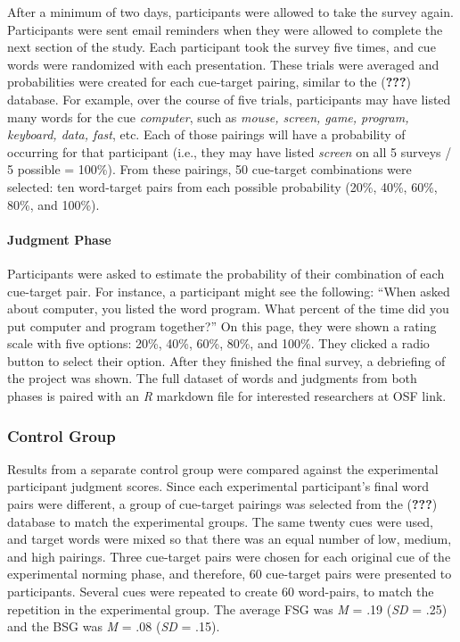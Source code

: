 \documentclass[english,man]{apa6}
\theoremstyle{definition}
\theoremstyle{definition}
\theoremstyle{definition}
\theoremstyle{remark}
\begin{document}
After a minimum of two days, participants were allowed to take the
survey again. Participants were sent email reminders when they were
allowed to complete the next section of the study. Each participant took
the survey five times, and cue words were randomized with each
presentation. These trials were averaged and probabilities were created
for each cue-target pairing, similar to the ({\textbf{???}}) database.
For example, over the course of five trials, participants may have
listed many words for the cue \emph{computer}, such as \emph{mouse,
screen, game, program, keyboard, data, fast}, etc. Each of those
pairings will have a probability of occurring for that participant
(i.e., they may have listed \emph{screen} on all 5 surveys / 5 possible
= 100\%). From these pairings, 50 cue-target combinations were selected:
ten word-target pairs from each possible probability (20\%, 40\%, 60\%,
80\%, and 100\%).

\paragraph{Judgment Phase}\label{judgment-phase}

Participants were asked to estimate the probability of their combination
of each cue-target pair. For instance, a participant might see the
following: \enquote{When asked about computer, you listed the word
program. What percent of the time did you put computer and program
together?} On this page, they were shown a rating scale with five
options: 20\%, 40\%, 60\%, 80\%, and 100\%. They clicked a radio button
to select their option. After they finished the final survey, a
debriefing of the project was shown. The full dataset of words and
judgments from both phases is paired with an \emph{R} markdown file for
interested researchers at OSF link.

\subsubsection{Control Group}\label{control-group}

Results from a separate control group were compared against the
experimental participant judgment scores. Since each experimental
participant's final word pairs were different, a group of cue-target
pairings was selected from the ({\textbf{???}}) database to match the
experimental groups. The same twenty cues were used, and target words
were mixed so that there was an equal number of low, medium, and high
pairings. Three cue-target pairs were chosen for each original cue of
the experimental norming phase, and therefore, 60 cue-target pairs were
presented to participants. Several cues were repeated to create 60
word-pairs, to match the repetition in the experimental group. The
average FSG was \emph{M} = .19 (\emph{SD} = .25) and the BSG was
\emph{M} = .08 (\emph{SD} = .15).
\end{document}
